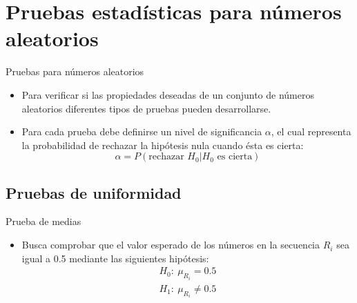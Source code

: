 \section[Pruebas estadísticas]{Pruebas estadísticas para números aleatorios}

\begin{frame}{Pruebas para números aleatorios}
    \begin{itemize}
        \item Para verificar si las propiedades deseadas de un conjunto de números aleatorios diferentes tipos de pruebas pueden desarrollarse.
        \item Para cada prueba debe definirse un nivel de significancia $\alpha$, el cual representa la probabilidad de rechazar la hipótesis nula cuando ésta es cierta:
        \begin{equation*}
            \alpha=P(\text{rechazar }H_0|H_0\text{ es cierta})
        \end{equation*}
        
    \end{itemize}
\end{frame}

\subsection{Pruebas de uniformidad}

\begin{frame}{Prueba de medias}
    \begin{itemize}
        \item Busca comprobar que el valor esperado de los números en la secuencia $R_i$ sea igual a 0.5 mediante las siguientes hipótesis: 
                \begin{eqnarray*}
                    H_0:~\mu_{R_i} = 0.5\\
                    H_1:~\mu_{R_i} \neq 0.5
                \end{eqnarray*}
    \end{itemize}
\end{frame}

